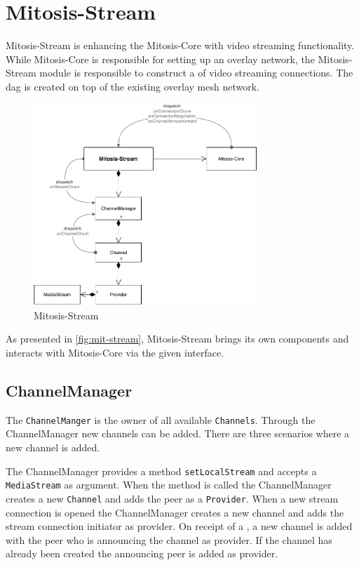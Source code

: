 \section{Mitosis-Stream}\label{chap:mitosis-stream}
Mitosis-Stream is enhancing the Mitosis-Core with video streaming functionality. While Mitosis-Core is responsible for setting up an overlay network, the Mitosis-Stream module is responsible to construct a  of video streaming connections. The \gls{dag} is created on top of the existing overlay mesh network.

\begin{figure}
\centering
\includegraphics[width=0.75\textwidth]{graphics/implementation/mitosis-architecture-mitosis-stream.pdf}
\caption{Mitosis-Stream}
\label{fig:mit-stream}
\end{figure}

As presented in \vref{fig:mit-stream}, Mitosis-Stream brings its own components and interacts with Mitosis-Core via the given interface. 

\subsection{ChannelManager}
The \lstinline|ChannelManger| is the owner of all available \lstinline|Channels|. Through the ChannelManager new channels can be added.
There are three scenarios where a new channel is added.
\begin{enumerate}
     The ChannelManager provides a method \lstinline|setLocalStream| and accepts a \lstinline|MediaStream| as argument. When the method is called the ChannelManager creates a new \lstinline|Channel| and adds the peer as a \lstinline|Provider|.
     When a new stream connection is opened the ChannelManager creates a new channel and adds the stream connection initiator as provider.
     On receipt of a \channelAnnouncement, a new channel is added with the peer who is announcing the channel as provider. If the channel has already been created the announcing peer is added as provider.
\end{enumerate}


